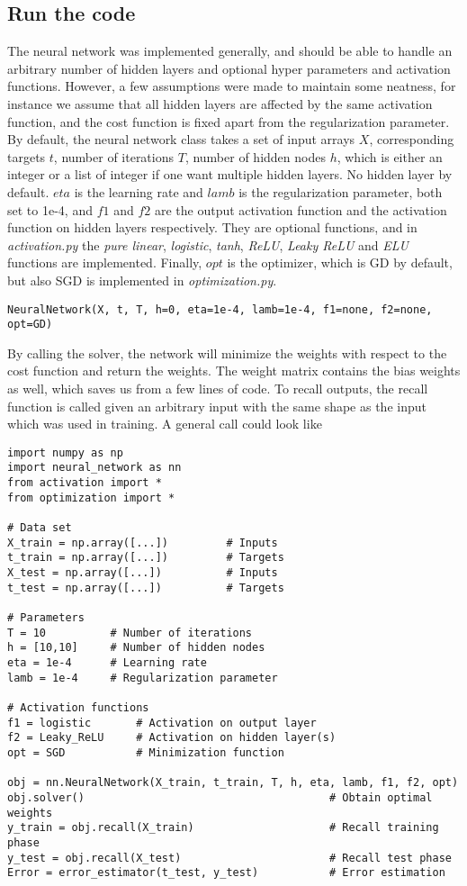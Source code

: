 \subsection{Run the code}
The neural network was implemented generally, and should be able to handle an arbitrary number of hidden layers and optional hyper parameters and activation functions. However, a few assumptions were made to maintain some neatness, for instance we assume that all hidden layers are affected by the same activation function, and the cost function is fixed apart from the regularization parameter. By default, the neural network class takes a set of input arrays $X$, corresponding targets $t$, number of iterations $T$, number of hidden nodes $h$, which is either an integer or a list of integer if one want multiple hidden layers. No hidden layer by default. $eta$ is the learning rate and $lamb$ is the regularization parameter, both set to 1e-4, and $f1$ and $f2$ are the output activation function and the activation function on hidden layers respectively. They are optional functions, and in \textit{activation.py} the \textit{pure linear}, \textit{logistic}, \textit{tanh}, \textit{ReLU}, \textit{Leaky ReLU} and \textit{ELU} functions are implemented. Finally, $opt$ is the optimizer, which is GD by default, but also SGD is implemented in \textit{optimization.py}.

\lstset{basicstyle=\scriptsize}
\begin{lstlisting}
NeuralNetwork(X, t, T, h=0, eta=1e-4, lamb=1e-4, f1=none, f2=none, opt=GD)
\end{lstlisting}
By calling the solver, the network will minimize the weights with respect to the cost function and return the weights. The weight matrix contains the bias weights as well, which saves us from a few lines of code. To recall outputs, the recall function is called given an arbitrary input with the same shape as the input which was used in training. A general call could look like

\lstset{basicstyle=\scriptsize}
\begin{lstlisting}
import numpy as np
import neural_network as nn
from activation import *
from optimization import *

# Data set
X_train = np.array([...])         # Inputs
t_train = np.array([...])         # Targets
X_test = np.array([...])          # Inputs
t_test = np.array([...])          # Targets

# Parameters
T = 10          # Number of iterations
h = [10,10]     # Number of hidden nodes
eta = 1e-4      # Learning rate
lamb = 1e-4     # Regularization parameter

# Activation functions
f1 = logistic       # Activation on output layer
f2 = Leaky_ReLU	    # Activation on hidden layer(s)
opt = SGD           # Minimization function

obj = nn.NeuralNetwork(X_train, t_train, T, h, eta, lamb, f1, f2, opt)
obj.solver()                                      # Obtain optimal weights
y_train = obj.recall(X_train)                     # Recall training phase
y_test = obj.recall(X_test)                       # Recall test phase
Error = error_estimator(t_test, y_test)           # Error estimation
\end{lstlisting}

